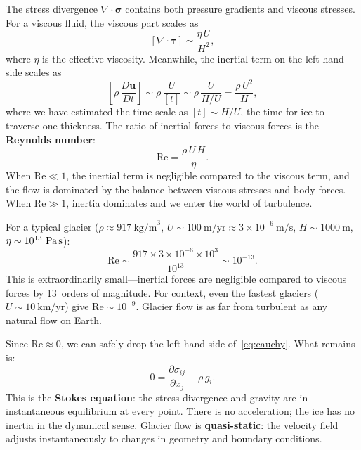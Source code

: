 \documentclass[11pt]{article}
\begin{document}
\medskip
\noindent The stress divergence $\nabla\cdot\bm{\sigma}$ contains both pressure gradients and viscous stresses.  For a viscous fluid, the viscous part scales as
\begin{equation}
  \left[\nabla\cdot\bm{\tau}\right] \sim \frac{\eta\,U}{H^2},
\end{equation}
where $\eta$ is the effective viscosity.  Meanwhile, the inertial term on the left-hand side scales as
\begin{equation}
  \left[\rho\,\frac{D\bm{u}}{Dt}\right] \sim \rho\,\frac{U}{[t]}
  \sim \rho\,\frac{U}{H/U} = \frac{\rho\,U^2}{H},
\end{equation}
where we have estimated the time scale as $[t] \sim H/U$, the time for ice to traverse one thickness.
The ratio of inertial forces to viscous forces is the \textbf{Reynolds number}:
\begin{equation}
  \mathrm{Re} = \frac{\rho\,U\,H}{\eta}.
\end{equation}
When $\mathrm{Re} \ll 1$, the inertial term is negligible compared to the viscous term, and the flow is dominated by the balance between viscous stresses and body forces.  When $\mathrm{Re} \gg 1$, inertia dominates and we enter the world of turbulence.

\medskip
\noindent For a typical glacier ($\rho \approx 917~\text{kg/m}^3$, $U \sim 100~\text{m/yr} \approx 3\times10^{-6}~\text{m/s}$, $H \sim 1000~\text{m}$, $\eta \sim 10^{13}~\text{Pa\,s}$):
\begin{equation}
  \mathrm{Re} \sim \frac{917 \times 3\times10^{-6} \times 10^3}{10^{13}} \sim 10^{-13}.
\end{equation}
This is extraordinarily small---inertial forces are negligible compared to viscous forces by 13~orders of magnitude.  For context, even the fastest glaciers ($U \sim 10~\text{km/yr}$) give $\mathrm{Re} \sim 10^{-9}$.  Glacier flow is as far from turbulent as any natural flow on Earth.

\medskip
\noindent Since $\mathrm{Re} \approx 0$, we can safely drop the left-hand side of~\eqref{eq:cauchy}.  What remains is:
\begin{equation}
  \boxed{0 = \frac{\partial \sigma_{ij}}{\partial x_j} + \rho\,g_i.}
  \label{eq:stokes_momentum}
\end{equation}
This is the \textbf{Stokes equation}: the stress divergence and gravity are in instantaneous equilibrium at every point.  There is no acceleration; the ice has no inertia in the dynamical sense.  Glacier flow is \textbf{quasi-static}: the velocity field adjusts instantaneously to changes in geometry and boundary conditions.
\end{document}
